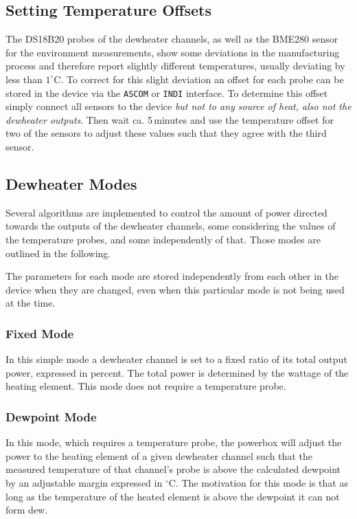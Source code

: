 \documentclass{scrartcl}
\begin{document}
\subsection{Setting Temperature Offsets}
The DS18B20 probes of the dewheater channels, as well as the BME280 sensor for
the environment measurements, show some deviations in the manufacturing process
and therefore report slightly different temperatures, usually deviating by less
than $1^{\circ}$C. To correct for this slight deviation an offset for each probe
can be stored in the device via the \texttt{ASCOM} or \texttt{INDI}
interface. To determine this offset simply connect all sensors to the device \emph{but
not to any source of heat, also not the dewheater outputs}. Then wait ca.
5\,minutes and use the temperature offset for two of the sensors to adjust these
values such that they agree with the third sensor.

\subsection{Dewheater Modes}
Several algorithms are implemented to control the amount of power directed
towards the outputs of the dewheater channels, some considering the values of
the temperature probes, and some independently of that. Those modes are outlined
in the following.

The parameters for each mode are stored independently from each other in the
device when they are changed, even when this particular mode is not being used
at the time.

\subsubsection{Fixed Mode}
\label{sec:dewheater_fixed}
In this simple mode a dewheater channel is set to a fixed ratio of its total
output power, expressed in percent. The total power is determined by the wattage
of the heating element. This mode does not require a temperature probe.

\subsubsection{Dewpoint Mode}
In this mode, which requires a temperature probe, the powerbox will adjust the
power to the heating element of a given dewheater channel such that the measured
temperature of that channel's probe is above the calculated dewpoint by an
adjustable margin expressed in $^{\circ}$C. The motivation for this mode is that
as long as the temperature of the heated element is above the dewpoint it can
not form dew.
\end{document}
